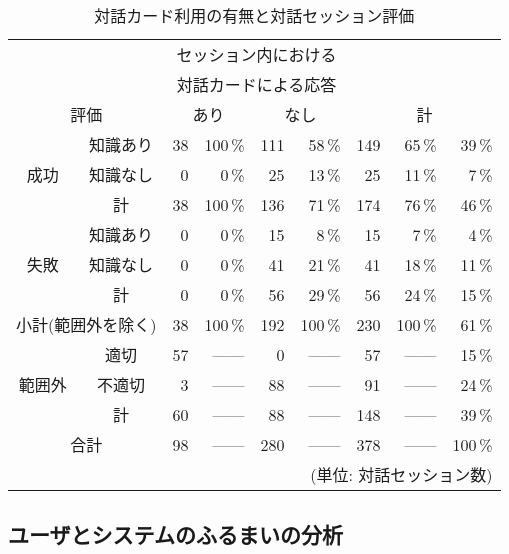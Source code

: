 \begin{table}
 \caption{対話カード利用の有無と対話セッション評価} \label{tab:対話カードと対話セッションの評価}
 \begin{center}
  \small
  \begin{tabular}{c|c|r@{ (}r@{) }|r@{ (}r@{) }|r@{ (}r@{ / }r@{) }} \hline
   \multicolumn{2}{c|}{} & \multicolumn{4}{c|}{セッション内における} \\
   \multicolumn{2}{c|}{} & \multicolumn{4}{c|}{対話カードによる応答} \\
   \cline{3-6}
   \multicolumn{2}{c|}{評価} & \multicolumn{2}{c|}{あり} &
   \multicolumn{2}{c|}{なし} & \multicolumn{3}{c}{計}\\ \hline \hline
      & 知識あり &  38 &   100\,\% & 111 & 58\,\%  & 149 &    65\,\% &  39\,\% \\
 成功 & 知識なし &   0 &     0\,\% &  25 & 13\,\%  &  25 &    11\,\% &   7\,\%   \\ \cline{2-9}
      & 計       &  38 &   100\,\% & 136 & 71\,\%  & 174 &    76\,\% &  46\,\% \\ \hline
      & 知識あり &   0 &     0\,\% &  15 &  8\,\%  &  15 &     7\,\% &   4\,\% \\
 失敗 & 知識なし &   0 &     0\,\% &  41 & 21\,\%  &  41 &    18\,\% &  11\,\% \\ \cline{2-9}
      & 計       &   0 &     0\,\% &  56 & 29\,\%  &  56 &    24\,\% &  15\,\% \\ \hline
   \multicolumn{2}{c|}{小計(範囲外を除く)}& 38 &   100\,\% & 192 &  100\,\% & 230 &   100\,\% &  61\,\%  \\ \hline
      & 適切   &  57 & ------  &  0 & ------  &  57 & ------  &  15\,\% \\
 範囲外 & 不適切 &   3 & ------  & 88 & ------  &  91 & ------  &  24\,\% \\ \cline{2-9}
      & 計     &  60 & ------  & 88 & ------  & 148 & ------  &  39\,\% \\ \hline
   \multicolumn{2}{c|}{合計} & 98 & ------ & 280 & ------  & 378 & ------  & 100\,\% \\ \hline
   \multicolumn{9}{r}{(単位: 対話セッション数)}
  \end{tabular}
 \end{center}
\end{table}



\subsection{ユーザとシステムのふるまいの分析}


